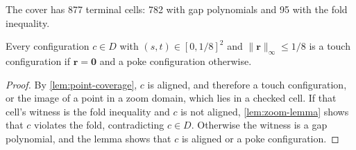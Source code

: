 The cover has 877 terminal cells: 782 with gap polynomials and 95 with the
fold inequality.

\begin{proposition}\label{prop:square-neighbourhood}
  Every configuration $c\in D$ with $(s,t)\in{[0,1/8]}^2$ and
  $\lVert\mathbf r\rVert_\infty\le1/8$ is a touch configuration if $\mathbf r=\mathbf0$
  and a poke configuration otherwise.
\end{proposition}
\begin{proof}
  By \cref{lem:point-coverage}, $c$ is aligned, and therefore a touch
  configuration, or the image of a point in a zoom domain, which lies in a
  checked cell. If that cell's witness is the fold inequality and $c$ is not
  aligned, \cref{lem:zoom-lemma} shows that $c$ violates the fold,
  contradicting $c\in D$. Otherwise the witness is a gap polynomial, and the
  lemma shows that $c$ is aligned or a poke configuration.
\end{proof}


